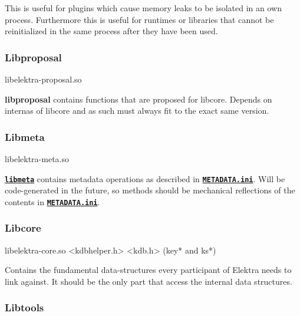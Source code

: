 This is useful for plugins which cause memory leaks to be isolated in an own process. Furthermore this is useful for runtimes or libraries that cannot be reinitialized in the same process after they have been used.

\subsubsection*{Libproposal}

\begin{DoxyVerb}libelektra-proposal.so
\end{DoxyVerb}


{\bfseries libproposal} contains functions that are proposed for libcore. Depends on internas of libcore and as such must always fit to the exact same version.

\subsubsection*{Libmeta}

\begin{DoxyVerb}libelektra-meta.so
\end{DoxyVerb}


{\bfseries \href{/home/markus/Projekte/Elektra/current/src/libs/meta/meta.c}{\tt libmeta}} contains metadata operations as described in {\bfseries \href{/home/markus/Projekte/Elektra/current/doc/METADATA.ini}{\tt M\+E\+T\+A\+D\+A\+T\+A.\+ini}}. Will be code-\/generated in the future, so methods should be mechanical reflections of the contents in {\bfseries \href{/home/markus/Projekte/Elektra/current/doc/METADATA.ini}{\tt M\+E\+T\+A\+D\+A\+T\+A.\+ini}}.

\subsubsection*{Libcore}

\begin{DoxyVerb}libelektra-core.so
<kdbhelper.h>
<kdb.h> (key* and ks*)
\end{DoxyVerb}


Contains the fundamental data-\/structures every participant of Elektra needs to link against. It should be the only part that access the internal data structures.

\subsubsection*{Libtools}

